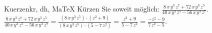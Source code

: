 \begin{MAufgabe}{Kuerzen}{kr, dh, MaTeX}
K\"urzen Sie soweit m\"oglich: $\frac{8\, x\, y^3\, z^7 + 72\, x\, y^3\, z^5}{40\, x\, y^3\, z^5 - 56\, x\, y^3\, z^7}$.\\ 
\ifLsg\MLoesung
\quad $\frac{8\, x\, y^3\, z^7 + 72\, x\, y^3\, z^5}{40\, x\, y^3\, z^5 - 56\, x\, y^3\, z^7}=\frac{(8\, x\, y^3\, z^5)\cdot(z^2 + 9)}{(8\, x\, y^3\, z^5)\cdot(5 - 7\, z^2)}=\frac{z^2 + 9}{5 - 7\, z^2}=\frac{ - z^2 - 9}{7\, z^2 - 5}$.\else\relax\fi
 \end{MAufgabe}